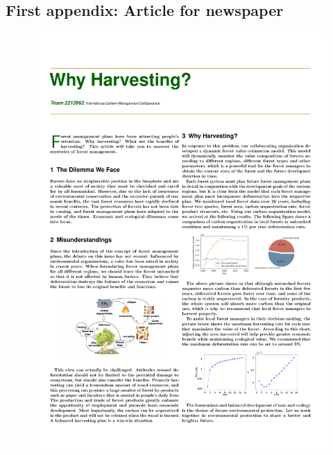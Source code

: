 \documentclass{mcmthesis}
\begin{document}


\begin{appendices}
\vspace{-0.5cm}
\section{First appendix: Article for newspaper}

\newpage
\begin{figure}[H]
\centering
\setlength{\abovecaptionskip}{0.cm}
\includegraphics[width = \textwidth]{mcmthesis-demo/figures/Nontechnical Article.pdf}
\end{figure}



\end{appendices}
\end{document}
